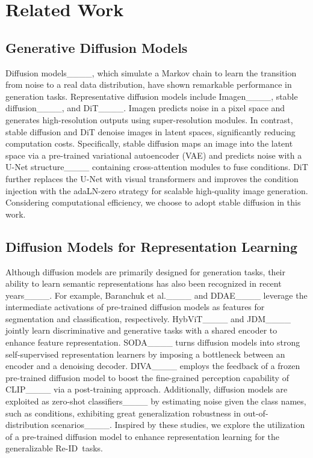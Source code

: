 \section{Related Work}
\subsection{Generative Diffusion Models}
Diffusion models____, which simulate a Markov chain to learn the transition from noise to a real data distribution, have shown remarkable performance in generation tasks. Representative diffusion models include Imagen____, stable diffusion____, and DiT____. Imagen predicts noise in a pixel space and generates high-resolution outputs using super-resolution modules. In contrast, stable diffusion and DiT denoise images in latent spaces, significantly reducing computation costs. Specifically, stable diffusion maps an image into the latent space via a pre-trained variational autoencoder (VAE) and predicts noise with a U-Net structure____ containing cross-attention modules to fuse conditions. DiT further replaces the U-Net with visual transformers and improves the condition injection with the adaLN-zero strategy for scalable high-quality image generation. Considering computational efficiency, we choose to adopt stable diffusion in this work.

\subsection{Diffusion Models for Representation Learning}
Although diffusion models are primarily designed for generation tasks, their ability to learn semantic representations has also been recognized in recent years____. For example, Baranchuk et al.____ and DDAE____ leverage the intermediate activations of pre-trained diffusion models as features for segmentation and classification, respectively. HybViT____ and JDM____ jointly learn discriminative and generative tasks with a shared encoder to enhance feature representation. 
SODA____ turns diffusion models into strong self-supervised representation learners by imposing a bottleneck between an encoder and a denoising decoder.
DIVA____ employs the feedback of a frozen pre-trained diffusion model to boost the fine-grained perception capability of CLIP____ via a post-training approach.
Additionally, diffusion models are exploited as zero-shot classifiers____ by estimating noise given the class names, such as conditions, exhibiting great generalization robustness in out-of-distribution scenarios____. Inspired by these studies, we explore the utilization of a pre-trained diffusion model to enhance representation learning for the generalizable \mbox{Re-ID tasks.}

